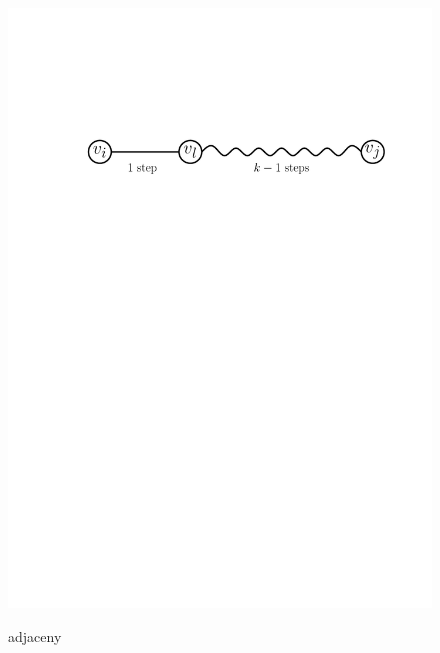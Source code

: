 \begin{figure}[htb]
{	\includegraphics[scale=.5]{01_graph_theory/pics/adjacency_k-induction.pdf}
}
\caption{adjaceny}
\end{figure}
\FloatBarrier

